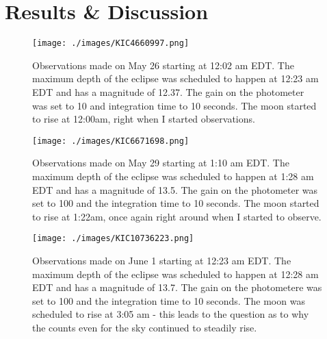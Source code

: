 \documentclass[12pt]{article}
\begin{document}
	\section{Results \& Discussion}
	
		\begin{figure}
			\texttt{[image: ./images/KIC4660997.png]}
			\caption{Observations made on May 26 starting at 12:02 am EDT. The maximum depth of the eclipse was scheduled to happen at 12:23 am EDT and has a magnitude of 12.37. The gain on the photometer was set to 10 and integration time to 10 seconds. The moon started to rise at 12:00am, right when I started observations.}
		\end{figure}
		
		\begin{figure}
			\texttt{[image: ./images/KIC6671698.png]}
			\caption{Observations made on May 29 starting at 1:10 am EDT. The maximum depth of the eclipse was scheduled to happen at 1:28 am EDT and has a magnitude of 13.5. The gain on the photometer was set to 100 and the integration time to 10 seconds. The moon started to rise at 1:22am, once again right around when I started to observe.}
		\end{figure}
		
		\begin{figure}
			\texttt{[image: ./images/KIC10736223.png]}
			\caption{Observations made on June 1 starting at 12:23 am EDT. The maximum depth of the eclipse was scheduled to happen at 12:28 am EDT and has a magnitude of 13.7. The gain on the photometere was set to 100 and the integration time to 10 seconds. The moon was scheduled to rise at 3:05 am - this leads to the question as to why the counts even for the sky continued to steadily rise.}
		\end{figure}
	
\end{document}
